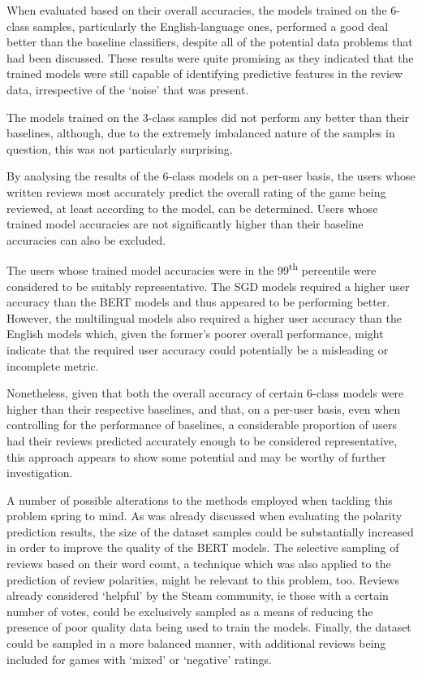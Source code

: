 When evaluated based on their overall accuracies, the models trained on the 6-class samples, particularly the English-language ones, performed a good deal better than the baseline classifiers, despite all of the potential data problems that had been discussed. These results were quite promising as they indicated that the trained models were still capable of identifying predictive features in the review data, irrespective of the `noise' that was present.

The models trained on the 3-class samples did not perform any better than their baselines, although, due to the extremely imbalanced nature of the samples in question, this was not particularly surprising.

By analysing the results of the 6-class models on a per-user basis, the users whose written reviews most accurately predict the overall rating of the game being reviewed, at least according to the model, can be determined. Users whose trained model accuracies are not significantly higher than their baseline accuracies can also be excluded.

The users whose trained model accuracies were in the 99\textsuperscript{th} percentile were considered to be suitably representative. The SGD models required a higher user accuracy than the BERT models and thus appeared to be performing better. However, the multilingual models also required a higher user accuracy than the English models which, given the former's poorer overall performance, might indicate that the required user accuracy could potentially be a misleading or incomplete metric.

Nonetheless, given that both the overall accuracy of certain 6-class models were higher than their respective baselines, and that, on a per-user basis, even when controlling for the performance of baselines, a considerable proportion of users had their reviews predicted accurately enough to be considered representative, this approach appears to show some potential and may be worthy of further investigation.

A number of possible alterations to the methods employed when tackling this problem spring to mind. As was already discussed when evaluating the polarity prediction results, the size of the dataset samples could be substantially increased in order to improve the quality of the BERT models. The selective sampling of reviews based on their word count, a technique which was also applied to the prediction of review polarities, might be relevant to this problem, too. Reviews already considered `helpful' by the Steam community, ie those with a certain number of votes, could be exclusively sampled as a means of reducing the presence of poor quality data being used to train the models. Finally, the dataset could be sampled in a more balanced manner, with additional reviews being included for games with `mixed' or `negative' ratings.

